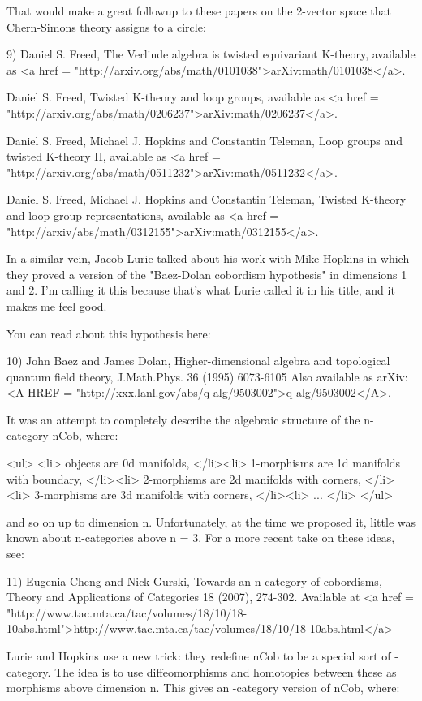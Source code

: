 That would make a great followup to these papers on the 2-vector 
space that Chern-Simons theory assigns to a circle:

9) Daniel S. Freed, The Verlinde algebra is twisted equivariant
K-theory, available as <a href =
"http://arxiv.org/abs/math/0101038">arXiv:math/0101038</a>.

Daniel S. Freed, Twisted K-theory and loop groups, available 
as 
<a href =
"http://arxiv.org/abs/math/0206237">arXiv:math/0206237</a>.

Daniel S. Freed, Michael J. Hopkins and Constantin Teleman,
Loop groups and twisted K-theory II, available as 
<a href = "http://arxiv.org/abs/math/0511232">arXiv:math/0511232</a>.

Daniel S. Freed, Michael J. Hopkins and Constantin Teleman,
Twisted K-theory and loop group representations, available as 
<a href = "http://arxiv/abs/math/0312155">arXiv:math/0312155</a>.
	
In a similar vein, Jacob Lurie talked about his work with Mike 
Hopkins in which they proved a version of the "Baez-Dolan cobordism 
hypothesis" in dimensions 1 and 2.   I'm calling it this because
that's what Lurie called it in his title, and it makes me feel good.  

You can read about this hypothesis here:

10) John Baez and James Dolan, Higher-dimensional algebra and
topological quantum field theory, J.Math.Phys. 36 (1995) 6073-6105
Also available as arXiv:<A HREF = "http://xxx.lanl.gov/abs/q-alg/9503002">q-alg/9503002</A>.

It was an attempt to completely describe the algebraic structure of 
the n-category nCob, where:

<ul>
<li>
 objects are 0d manifolds,
</li><li>
 1-morphisms are 1d manifolds with boundary, 
</li><li>
 2-morphisms are 2d manifolds with corners,
</li><li>
 3-morphisms are 3d manifolds with corners,
</li><li>
 ...
</li>
</ul>

and so on up to dimension n.  Unfortunately, at the time we
proposed it, little was known about n-categories above n = 3.
For a more recent take on these ideas, see:

11) Eugenia Cheng and Nick Gurski, Towards an n-category of 
cobordisms, Theory and Applications of Categories 18 (2007),
274-302.  Available at 
<a href = "http://www.tac.mta.ca/tac/volumes/18/10/18-10abs.html">http://www.tac.mta.ca/tac/volumes/18/10/18-10abs.html</a>

Lurie and Hopkins use a new trick: they redefine nCob to be a 
special sort of \infty -category.  The idea is to use 
diffeomorphisms and homotopies between these as morphisms above 
dimension n.  This gives an \infty -category version of nCob, 
where:


